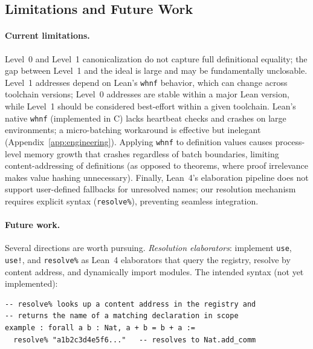 \subsection{Limitations and Future Work}
\label{sec:limits}

\paragraph{Current limitations.}
Level~0 and Level~1 canonicalization do not capture full definitional
equality; the gap between Level~1 and the ideal is large and may be
fundamentally unclosable.  Level~1 addresses depend on Lean's
\texttt{whnf} behavior, which can change across toolchain versions;
Level~0 addresses are stable within a major Lean version, while Level~1
should be considered best-effort within a given toolchain.  Lean's
native \texttt{whnf} (implemented in C) lacks heartbeat checks and
crashes on large environments; a micro-batching workaround is effective
but inelegant (Appendix~\ref{app:engineering}).  Applying \texttt{whnf}
to definition values causes process-level memory growth that crashes
regardless of batch boundaries, limiting content-addressing of
definitions (as opposed to theorems, where proof irrelevance makes value
hashing unnecessary).  Finally, Lean~4's elaboration pipeline does not
support user-defined fallbacks for unresolved names; our resolution
mechanism requires explicit syntax (\texttt{resolve\%}), preventing
seamless integration.

\paragraph{Future work.}
\label{sec:future}
Several directions are worth pursuing.  \emph{Resolution elaborators}:
implement \texttt{use}, \texttt{use!}, and \texttt{resolve\%} as Lean~4
elaborators that query the registry, resolve by content address, and
dynamically import modules.  The intended syntax (not yet implemented):

\begin{lstlisting}[caption={Prospective resolution syntax (not yet implemented)}]
-- resolve% looks up a content address in the registry and
-- returns the name of a matching declaration in scope
example : forall a b : Nat, a + b = b + a :=
  resolve% "a1b2c3d4e5f6..."   -- resolves to Nat.add_comm
\end{lstlisting}

